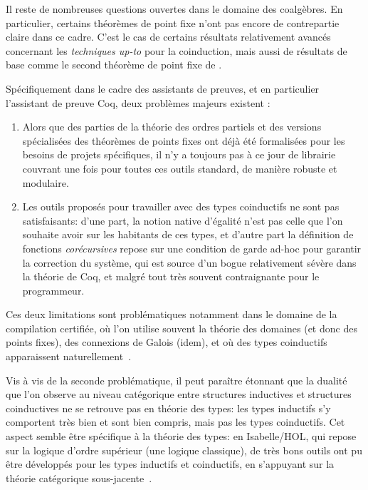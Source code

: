 \documentclass[a4paper,11pt]{article}
\begin{document}
Il reste de nombreuses questions ouvertes dans le domaine des coalgèbres. En particulier, 
certains théorèmes de point fixe n'ont pas encore de contrepartie claire dans ce cadre.
C'est le cas de certains résultats relativement avancés concernant les \emph{techniques up-to} pour la coinduction\cite{pous:lics16:cawu,pr19:lmcs:companion}, mais aussi de résultats de base comme le second théorème de point fixe de \cite[chapitre~8]{DaveyPriestley90}. 

Spécifiquement dans le cadre des assistants de preuves, et en particulier
l'assistant de preuve Coq, deux problèmes majeurs existent :
\begin{enumerate}
\item Alors que des parties de la théorie des ordres partiels et des versions spécialisées des théorèmes de points fixes ont déjà été formalisées pour les besoins de projets spécifiques, il n'y a toujours pas à ce jour de librairie couvrant une fois pour toutes ces outils standard, de manière robuste et modulaire.
\item Les outils proposés pour travailler avec des types coinductifs ne sont pas satisfaisants: d'une part, la notion native d'égalité n'est pas celle que l'on souhaite avoir sur les habitants de ces types, et d'autre part la définition de fonctions \emph{corécursives} repose sur une condition de garde ad-hoc pour garantir la correction du système, qui est source d'un bogue relativement sévère dans la théorie de Coq, et malgré tout très souvent contraignante pour le programmeur.
\end{enumerate}
Ces deux limitations sont problématiques notamment dans le domaine de la compilation certifiée, où l'on utilise souvent la théorie des domaines (et donc des points fixes), des connexions de Galois (idem), et où des types coinductifs apparaissent naturellement~\cite{compcert,itrees}.

Vis à vis de la seconde problématique, il peut paraître étonnant que la dualité que l'on observe au niveau catégorique entre structures inductives et structures coinductives ne se retrouve pas en théorie des types: les types inductifs s'y comportent très bien et sont bien compris, mais pas les types coinductifs.
Cet aspect semble être spécifique à la théorie des types: en Isabelle/HOL, qui repose sur la logique  d'ordre supérieur (une logique classique), de très bons outils ont pu être développés pour les types inductifs et coinductifs, en s'appuyant sur la théorie catégorique sous-jacente~\cite{DBLP:conf/frocos/BiendarraBBDFHK17}.
\end{document}
